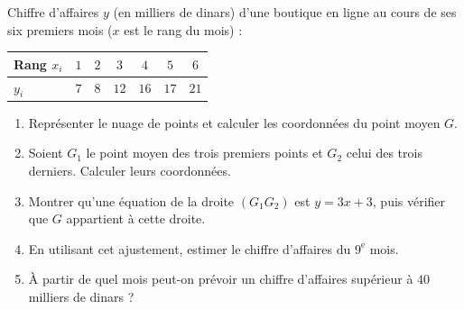 
\newcommand{\R}{\mathbb{R}}
\newcommand{\vect}[1]{\overrightarrow{#1}}

Chiffre d'affaires $y$ (en milliers de dinars) d'une boutique en ligne au cours de ses six premiers mois ($x$ est le rang du mois) :
\begin{center}
\begin{tabular}{|l|c|c|c|c|c|c|}\hline
Rang $x_i$ & $1$ & $2$ & $3$ & $4$ & $5$ & $6$ \\\hline
$y_i$ & $7$ & $8$ & $12$ & $16$ & $17$ & $21$ \\\hline
\end{tabular}\end{center}
\begin{enumerate}
  \item Représenter le nuage de points et calculer les coordonnées du point moyen $G$.
  \item Soient $G_1$ le point moyen des trois premiers points et $G_2$ celui des trois derniers. Calculer leurs coordonnées.
  \item Montrer qu'une équation de la droite $(G_1G_2)$ est $y=3x+3$, puis vérifier que $G$ appartient à cette droite.
  \item En utilisant cet ajustement, estimer le chiffre d'affaires du $9^{\text{e}}$ mois.
  \item À partir de quel mois peut-on prévoir un chiffre d'affaires supérieur à $40$ milliers de dinars ?
\end{enumerate}

